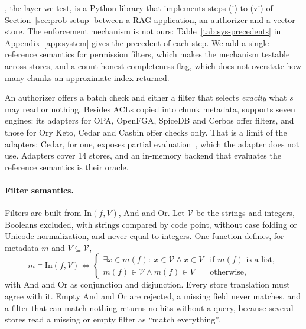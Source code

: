 
\sys{}, the layer we test, is a Python library that implements steps (i) to (vi) of
Section~\ref{sec:prob-setup} between a RAG application, an authorizer and a vector store. The enforcement
mechanism is not ours: Table~\ref{tab:sys-precedents} in Appendix~\ref{app:system} gives the precedent of
each step. We add a single reference semantics for permission filters, which makes the mechanism testable
across stores, and a count-honest completeness flag, which does not overstate how many chunks an
approximate index returned.

An authorizer offers a batch check and either a filter that selects \emph{exactly} what $s$ may read or nothing.
Besides ACLs copied into chunk metadata, \sys{} supports seven engines: its adapters for OPA, OpenFGA, SpiceDB and Cerbos offer
filters, and those for Ory Keto, Cedar and Casbin offer checks only. That is a limit of the adapters: Cedar, for one, exposes
partial evaluation~\cite{cedar2026cedarpolicy}, which the adapter does not use. Adapters cover 14 stores, and an in-memory backend that
evaluates the reference semantics is their oracle.

\paragraph{Filter semantics.}
Filters are built from $\mathrm{In}(f,V)$, $\mathrm{And}$ and $\mathrm{Or}$. Let $\mathcal{V}$ be the
strings and integers, Booleans excluded, with strings compared by code point, without case folding
or Unicode normalization, and never equal to integers. One function defines, for metadata $m$ and
$V \subseteq \mathcal{V}$,
\begin{equation}\label{eq:sys-in}
m \models \mathrm{In}(f,V) \iff
\begin{cases}
\exists x \in m(f):\ x \in \mathcal{V} \wedge x \in V & \text{if } m(f) \text{ is a list},\\
m(f) \in \mathcal{V} \wedge m(f) \in V & \text{otherwise},
\end{cases}
\end{equation}
with And and Or as conjunction and disjunction. Every store translation must agree with it. Empty And
and Or are rejected, a missing field never matches, and a filter that can match nothing returns no hits
without a query, because several stores read a missing or empty filter as ``match everything''.


